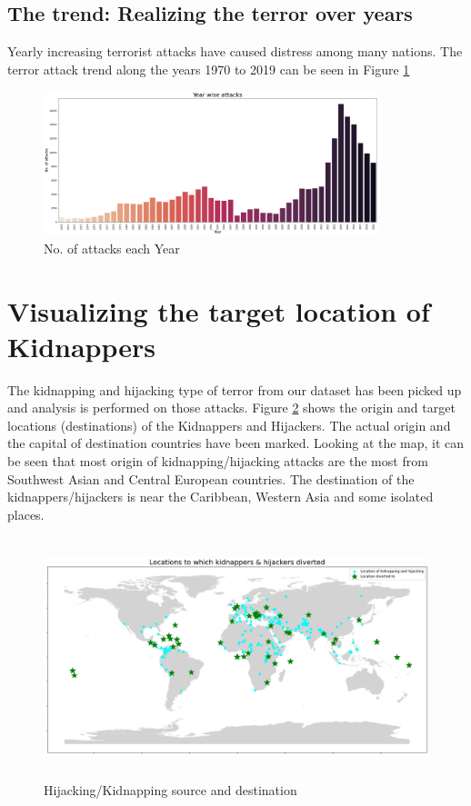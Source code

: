\documentclass{article}
\begin{document}
\subsection{The trend: Realizing the terror over years}
Yearly increasing terrorist attacks have caused distress among many nations.  The terror attack trend along the years 1970 to 2019 can be seen in Figure \ref{fig:figure1}
\begin{figure} [h]
\begin{center}
\includegraphics[height=4.2cm]{img/yearlytrend.png} 
\caption{No. of attacks each Year}
\label{fig:figure1}
\end{center}
\end{figure}

\section{Visualizing the target location of Kidnappers}
The kidnapping and hijacking type of terror from our dataset has been picked up and analysis is performed on those attacks. Figure \ref{fig:figure2} shows the origin and target locations (destinations) of the Kidnappers and Hijackers. 
The actual origin and the capital of destination countries have been marked. Looking at the map, it can be seen that most origin of kidnapping/hijacking attacks are the most from Southwest Asian and Central European countries. The destination of the kidnappers/hijackers is near the Caribbean, Western Asia and some isolated places.

\begin{figure} [h]
\begin{center}
\includegraphics[height=7cm]{img/kidnaplocations.png} 
\caption{Hijacking/Kidnapping source and destination}
\label{fig:figure2}
\end{center}
\end{figure}
\end{document}
